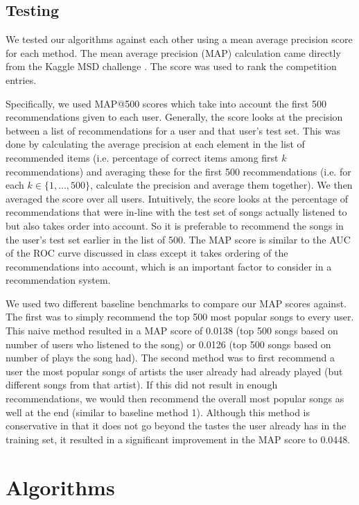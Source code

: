 \documentclass[12pt,preprint]{aastex}
\begin{document}
\subsection{Testing}
We tested our algorithms against each other using a mean average precision 
score for each method.  The mean average precision (MAP) calculation came directly from the Kaggle MSD challenge \citep{McFee:2012:MSD:2187980.2188222}. The score was used to rank the competition entries.

Specifically, we used MAP@500 scores which take into account the first 500 recommendations given to each user. Generally, the score looks at the precision between a list of recommendations for a user and that user's test set. This was done by calculating the average precision at each element in the list of recommended items (i.e. percentage of correct items among first $k$ recommendations) and averaging these for the first 500 recommendations (i.e. for each $k \in \{1, ..., 500\}$, calculate the precision and average them together).
We then averaged the score over all users. Intuitively, the score looks at the percentage of recommendations that were in-line with the test set of songs actually listened to but also takes order into account. So it is preferable to recommend the songs in the user's test set earlier in the list of 500. The MAP score is similar to the AUC of the ROC curve discussed in class except it takes ordering of the recommendations into account, which is an important factor to consider in a recommendation system.

We used two different baseline benchmarks \citep{McFee:2012:MSD:2187980.2188222} to compare our MAP scores against. The first was to simply recommend the top 500 most popular songs to every user. This naive method resulted in a MAP score of 0.0138 (top 500 songs based on number of users who listened to the song) or 0.0126 (top 500 songs based on number of plays the song had). The second method was to first recommend a user the most popular songs of artists the user already had already played (but different songs from that artist). If this did not result in enough recommendations, we would then recommend the overall most popular songs as well at the end (similar to baseline method 1). Although this method is conservative in that it does not go beyond the tastes the user already has in the training set, it resulted in a significant improvement in the MAP score to 0.0448.




\section{Algorithms}
\end{document}
